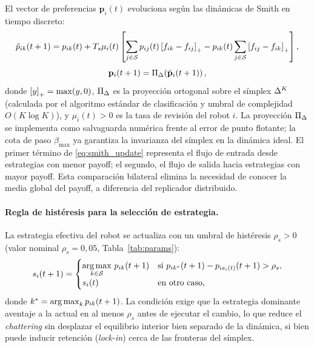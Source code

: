 El vector de preferencias $\mathbf{p}_i(t)$ evoluciona según las dinámicas de
Smith en tiempo discreto:
\begin{equation}
  \tilde{p}_{ik}(t+1) = p_{ik}(t) + T_s \mu_i(t) \left[
    \sum_{j \in \mathcal{S}} p_{ij}(t)\left[f_{ik} - f_{ij}\right]_{+}
    - p_{ik}(t) \sum_{j \in \mathcal{S}} \left[f_{ij} - f_{ik}\right]_{+}
  \right],
  \label{eq:smith_update}
\end{equation}
\begin{equation}
  \mathbf{p}_i(t+1) = \Pi_{\Delta}\!\left(\tilde{\mathbf{p}}_i(t+1)\right),
  \label{eq:proyeccion}
\end{equation}
donde $\left[y\right]_{+} = \max(y, 0)$, $\Pi_{\Delta}$ es la proyección ortogonal sobre
el símplex $\Delta^K$ (calculada por el algoritmo estándar de clasificación
y umbral de complejidad $O(K\log K)$), y $\mu_i(t) > 0$ es la tasa de revisión del robot $i$.
La proyección $\Pi_{\Delta}$ se implementa como salvaguarda numérica frente al
error de punto flotante; la cota de paso $\beta_{\max}$ ya garantiza la invarianza
del símplex en la dinámica ideal.
El primer término de \eqref{eq:smith_update} representa el flujo de entrada desde
estrategias con menor payoff; el segundo, el flujo de salida hacia estrategias con
mayor payoff. Esta comparación bilateral elimina la necesidad de conocer la media
global del payoff, a diferencia del replicador distribuido.

\paragraph{Regla de histéresis para la selección de estrategia.}
La estrategia efectiva del robot se actualiza con un umbral de histéresis
$\rho_s > 0$ (valor nominal $\rho_s = 0{,}05$, Tabla~\ref{tab:params}):
\begin{equation}
  s_i(t+1) = \begin{cases}
    \displaystyle\operatorname*{arg\,max}_{k \in \mathcal{S}}\, p_{ik}(t+1) &
      \text{si } p_{ik^*}(t+1) - p_{i s_i(t)}(t+1) > \rho_s, \\
    s_i(t) & \text{en otro caso,}
  \end{cases}
  \label{eq:hysteresis}
\end{equation}
donde $k^* = \operatorname*{arg\,max}_k p_{ik}(t+1)$. La condición exige que la estrategia dominante
aventaje a la actual en al menos $\rho_s$ antes de ejecutar el cambio, lo que reduce
el \emph{chattering} sin desplazar el equilibrio interior bien separado de la dinámica,
si bien puede inducir retención (\emph{lock-in}) cerca de las fronteras del símplex.

